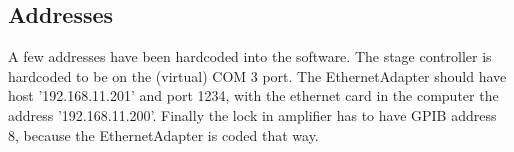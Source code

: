 \subsection{Addresses}
A few addresses have been hardcoded into the software. The stage controller is hardcoded to be on the (virtual) COM 3 port. The EthernetAdapter should have host '192.168.11.201' and port 1234, with the ethernet card in the computer the address '192.168.11.200'. Finally the lock in amplifier has to have GPIB address 8, because the EthernetAdapter is coded that way.

